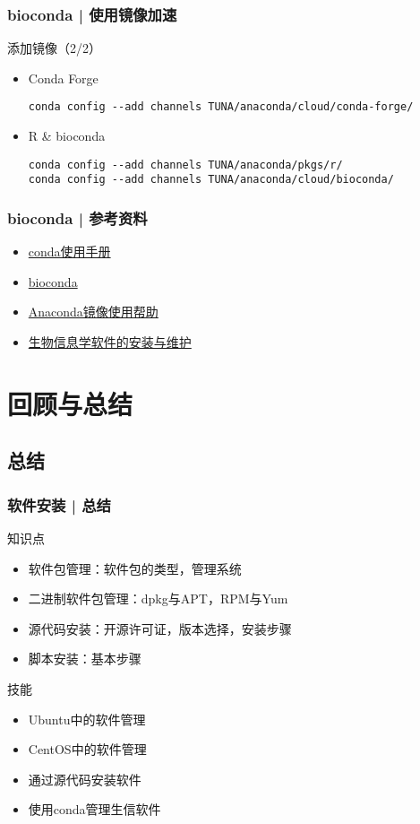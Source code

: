 \begin{frame}[fragile]
  \frametitle{bioconda | 使用镜像加速}
  \begin{block}{添加镜像（2/2）}
    \begin{itemize}
      \item Conda Forge
\begin{lstlisting}
conda config --add channels TUNA/anaconda/cloud/conda-forge/
\end{lstlisting}
      \item R \& bioconda
\begin{lstlisting}
conda config --add channels TUNA/anaconda/pkgs/r/
conda config --add channels TUNA/anaconda/cloud/bioconda/
\end{lstlisting}
    \end{itemize}
  \end{block}
\end{frame}

\begin{frame}
  \frametitle{bioconda | 参考资料}
  \begin{itemize}
    \item \href{https://conda.io/docs/}{conda使用手册}
    \item \href{https://bioconda.github.io/}{bioconda}
    \item \href{https://mirrors.tuna.tsinghua.edu.cn/help/anaconda/}{Anaconda镜像使用帮助}
    \item \href{https://github.com/Yixf-Education/demo4bx/tree/master/conda}{生物信息学软件的安装与维护}
  \end{itemize}
\end{frame}

\section{回顾与总结}
\subsection{总结}
\begin{frame}
  \frametitle{软件安装 | 总结}
  \begin{block}{知识点}
    \begin{itemize}
      \item 软件包管理：软件包的类型，管理系统
      \item 二进制软件包管理：dpkg与APT，RPM与Yum
      \item 源代码安装：开源许可证，版本选择，安装步骤
      \item 脚本安装：基本步骤
    \end{itemize}
  \end{block}
  \begin{block}{技能}
    \begin{itemize}
      \item Ubuntu中的软件管理
      \item CentOS中的软件管理
      \item 通过源代码安装软件
      \item 使用conda管理生信软件
    \end{itemize}
  \end{block}
\end{frame}

